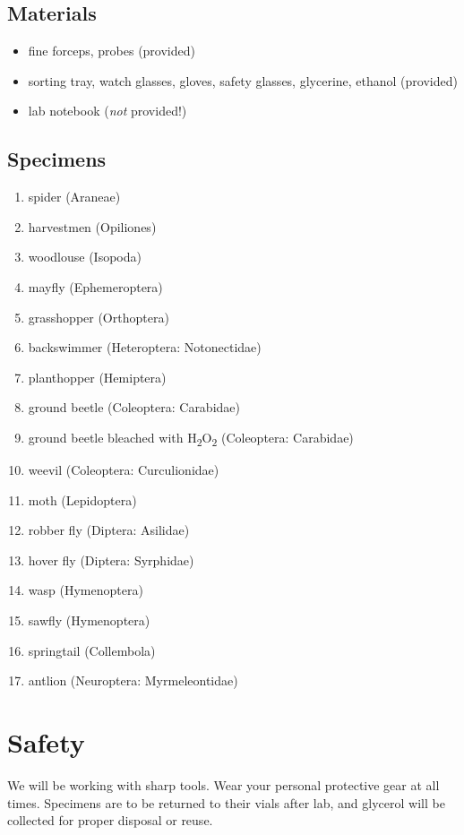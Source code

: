 \documentclass[letterpaper, 11pt]{article}
\begin{document}
\subsection*{Materials}

\begin{itemize}
\item fine forceps, probes (provided)
\item sorting tray, watch glasses, gloves, safety glasses, glycerine, ethanol (provided)
\item {lab notebook (\textit{not} provided!)}
\end{itemize}

\subsection*{Specimens}

\begin{enumerate}
\item spider (Araneae)
\item harvestmen (Opiliones)
\item woodlouse (Isopoda)
\item mayfly (Ephemeroptera)
\item grasshopper (Orthoptera)
\item backswimmer (Heteroptera: Notonectidae)
\item planthopper (Hemiptera)
\item ground beetle (Coleoptera: Carabidae)
\item ground beetle bleached with H\textsubscript{2}O\textsubscript{2} (Coleoptera: Carabidae)
\item weevil (Coleoptera: Curculionidae)
\item moth (Lepidoptera)
\item robber fly (Diptera: Asilidae)
\item hover fly (Diptera: Syrphidae)
\item wasp (Hymenoptera)
\item sawfly (Hymenoptera)
\item springtail (Collembola)
\item antlion (Neuroptera: Myrmeleontidae)
\end{enumerate}

\section*{Safety}
We will be working with sharp tools. Wear your personal protective gear at all times. Specimens are to be returned to their vials after lab, and glycerol will be collected for proper disposal or reuse.
\end{document}
